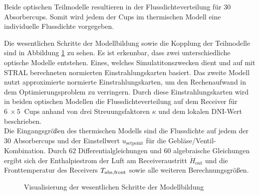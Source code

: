 Beide optischen Teilmodelle resultieren in der Flussdichteverteilung für $30$ Absorbercups.
Somit wird jedem der Cups im thermischen Modell eine individuelle Flussdichte vorgegeben.

Die wesentlichen Schritte der Modellbildung sowie die Kopplung der Teilmodelle sind in Abbildung \ref{fig_ZusammenfassungKopplung} zu sehen.
Es ist erkennbar, dass zwei unterschiedliche optische Modelle entstehen.
Eines, welches Simulatitonszwecken dient und auf mit STRAL berechneten normierten Einstrahlungskarten basiert.
Das zweite Modell nutzt approximierte normierte Einstrahlungskarten, um den Rechenaufwand in dem Optimierungsproblem zu verringern.
Durch diese Einstrahlungskarten wird in beiden optischen Modellen die Flussdichteverteilung auf dem Receiver für $\SI{6}{} \times \SI{5}{}$ Cups anhand von drei Streuungsfaktoren $\kappa$ und dem lokalen DNI-Wert beschrieben.\\
Die Eingangsgrößen des thermischen Modells sind die Flussdichte auf jedem der 30 Absorbercups und der Einstellwert $u_{\mathrm{setpoint}}$ für die Gebläse/Ventil-Kombination.
Durch $62$ Differentialgleichungen und $60$ algebraische Gleichungen ergibt sich der Enthalpiestrom der Luft am Receiveraustritt $\dot{H}_{\mathrm{out}}$ und die Fronttemperatur des Receivers $T_{\mathrm{abs,front}}$ sowie alle weiteren Berechnungsgrößen.

\begin{figure}[p]
    \centering
    \setlength{\fboxsep}{1pt}
    \setlength{\fboxrule}{1pt}
    \caption[Visualisierung der wesentlichen Schritte der Modellbildung]{Visualisierung der wesentlichen Schritte der Modellbildung}
    \label{fig_ZusammenfassungKopplung}
\end{figure}
